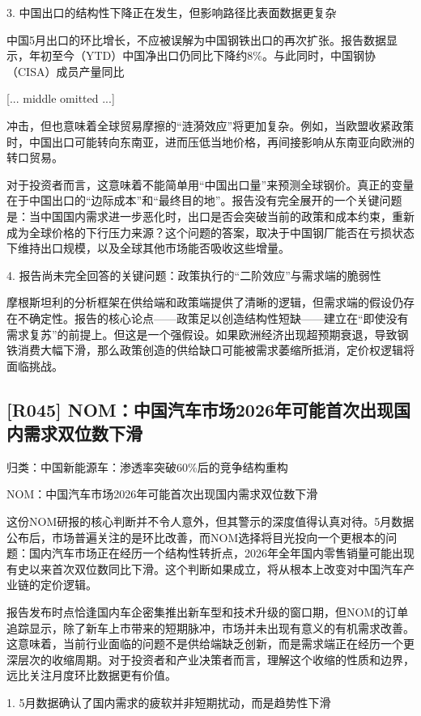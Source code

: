 \documentclass[11pt]{ctexart}
\begin{document}
3. 中国出口的结构性下降正在发生，但影响路径比表面数据更复杂

中国5月出口的环比增长，不应被误解为中国钢铁出口的再次扩张。报告数据显示，年初至今（YTD）中国净出口仍同比下降约8\%。与此同时，中国钢协（CISA）成员产量同比

[... middle omitted ...]

冲击，但也意味着全球贸易摩擦的“涟漪效应”将更加复杂。例如，当欧盟收紧政策时，中国出口可能转向东南亚，进而压低当地价格，再间接影响从东南亚向欧洲的转口贸易。

对于投资者而言，这意味着不能简单用“中国出口量”来预测全球钢价。真正的变量在于中国出口的“边际成本”和“最终目的地”。报告没有完全展开的一个关键问题是：当中国国内需求进一步恶化时，出口是否会突破当前的政策和成本约束，重新成为全球价格的下行压力来源？这个问题的答案，取决于中国钢厂能否在亏损状态下维持出口规模，以及全球其他市场能否吸收这些增量。

4. 报告尚未完全回答的关键问题：政策执行的“二阶效应”与需求端的脆弱性

摩根斯坦利的分析框架在供给端和政策端提供了清晰的逻辑，但需求端的假设仍存在不确定性。报告的核心论点——政策足以创造结构性短缺——建立在“即使没有需求复苏”的前提上。但这是一个强假设。如果欧洲经济出现超预期衰退，导致钢铁消费大幅下滑，那么政策创造的供给缺口可能被需求萎缩所抵消，定价权逻辑将面临挑战。

\subsection{[R045] NOM：中国汽车市场2026年可能首次出现国内需求双位数下滑}
{\small\color{refgray}归类：中国新能源车：渗透率突破60\%后的竞争结构重构}

NOM：中国汽车市场2026年可能首次出现国内需求双位数下滑

这份NOM研报的核心判断并不令人意外，但其警示的深度值得认真对待。5月数据公布后，市场普遍关注的是环比改善，而NOM选择将目光投向一个更根本的问题：国内汽车市场正在经历一个结构性转折点，2026年全年国内零售销量可能出现有史以来首次双位数同比下滑。这个判断如果成立，将从根本上改变对中国汽车产业链的定价逻辑。

报告发布时点恰逢国内车企密集推出新车型和技术升级的窗口期，但NOM的订单追踪显示，除了新车上市带来的短期脉冲，市场并未出现有意义的有机需求改善。这意味着，当前行业面临的问题不是供给端缺乏创新，而是需求端正在经历一个更深层次的收缩周期。对于投资者和产业决策者而言，理解这个收缩的性质和边界，远比关注月度环比数据更有价值。

1. 5月数据确认了国内需求的疲软并非短期扰动，而是趋势性下滑
\end{document}
